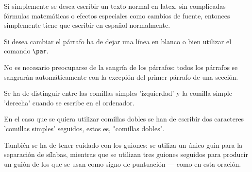 \documentclass[a4paper,10pt]{letter}
\begin{document}
Si simplemente se desea escribir un texto normal en latex,
sin complicadas f\'ormulas matem\'aticas o efectos especiales
como cambios  de fuente, entonces simplemente tiene que escribir
en espa\~nol normalmente.
\par
Si desea cambiar el p\'arrafo ha de dejar una l\'inea en blanco o bien
utilizar el comando \verb|\par|.

No es necesario preocuparse de la sangr\'ia de los p\'arrafos:
todos los p\'arrafos se sangrar\'an autom\'aticamente con la excepi\'on
del primer p\'arrafo de una secci\'on.

Se ha de distinguir entre las comillas simples 'izquierdad' 
y la comilla simple 'derecha' cuando se escribe en el ordenador.

En el caso que se quiera utilizar comillas dobles se han de
escribir dos caracteres 'comillas simples' seguidos, estos es,
"comillas dobles".

Tambi\'en se ha de tener cuidado con los guiones: se utiliza un \'unico
guin para la separaci\'on de s\'ilabas, mientras que se utilizan 
tres  guiones seguidos para producir un gui\'on de los que se usan
como signo de puntuaci\'on --- como en esta oraci\'on.
\end{document}
